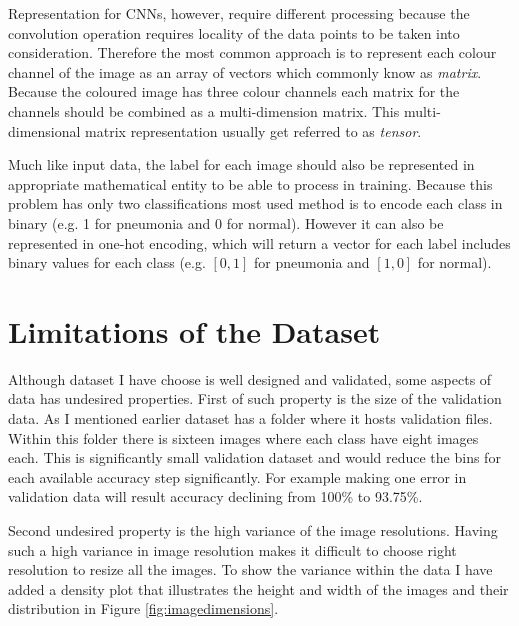 Representation for CNNs, however, require different processing because the convolution operation requires locality of the data points to be taken into consideration.
Therefore the most common approach is to represent each colour channel of the image as an array of vectors which commonly know as \emph{matrix}.
Because the coloured image has three colour channels each matrix for the channels should be combined as a multi-dimension matrix.
This multi-dimensional matrix representation usually get referred to as \emph{tensor}.

Much like input data, the label for each image should also be represented in appropriate mathematical entity to be able to process in training.
Because this problem has only two classifications most used method is to encode each class in binary (e.g. 1 for pneumonia and 0 for normal).
However it can also be represented in one-hot encoding, which will return a vector for each label includes binary values for each class (e.g. $[0, 1]$ for pneumonia and $[1, 0]$ for normal).


\section{Limitations of the Dataset} \label{sec:datalimitations}
Although dataset I have choose is well designed and validated, some aspects of data has undesired properties.
First of such property is the size of the validation data.
As I mentioned earlier dataset has a folder where it hosts validation files.
Within this folder there is sixteen images where each class have eight images each.
This is significantly small validation dataset and would reduce the bins for each available accuracy step significantly.
For example making one error in validation data will result accuracy declining from 100\% to 93.75\%.

Second undesired property is the high variance of the image resolutions.
Having such a high variance in image resolution makes it difficult to choose right resolution to resize all the images.
To show the variance within the data I have added a density plot that illustrates the height and width of the images and their distribution in Figure \ref{fig:imagedimensions}.

